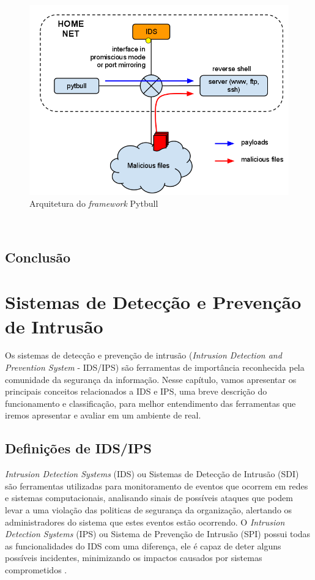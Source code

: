 \documentclass[
	12pt,				
	openright,		
	twoside,	
	a4paper,
	english,	
	brazil	
	]{abntex2}
\begin{document}
 \begin{figure}[!htb]
  \centering
  \includegraphics[scale=.4]{arquitetura_pytbull.png}
  \caption{Arquitetura do \textit{framework} Pytbull}
  \label{fig:pytbull}
 \end{figure}

 \
 \section{Conclusão}
 \chapter{Sistemas de Detecção e Prevenção de Intrusão}

Os sistemas de detecção e prevenção de intrusão (\textit{Intrusion Detection and Prevention System} - IDS/IPS) são ferramentas de importância reconhecida pela comunidade da segurança da informação. Nesse capítulo, vamos apresentar os principais conceitos relacionados a IDS e IPS, uma breve descrição do funcionamento e classificação, para melhor entendimento das ferramentas que iremos apresentar e avaliar em um ambiente de real.

 \section{Definições de IDS/IPS}

 \textit{Intrusion Detection Systems} (IDS) ou Sistemas de Detecção de Intrusão (SDI) são ferramentas utilizadas para monitoramento de eventos que ocorrem em redes e sistemas computacionais, analisando sinais de possíveis ataques que podem levar a uma violação das politicas de segurança da organização, alertando os administradores do sistema que estes eventos estão ocorrendo. O \textit{Intrusion Detection Systems} (IPS) ou Sistema de Prevenção de Intrusão (SPI) possui todas as funcionalidades do IDS com uma diferença, ele é capaz de deter alguns possíveis incidentes, minimizando os impactos causados por sistemas comprometidos \cite{mukhopadhyay01}.
\end{document}
